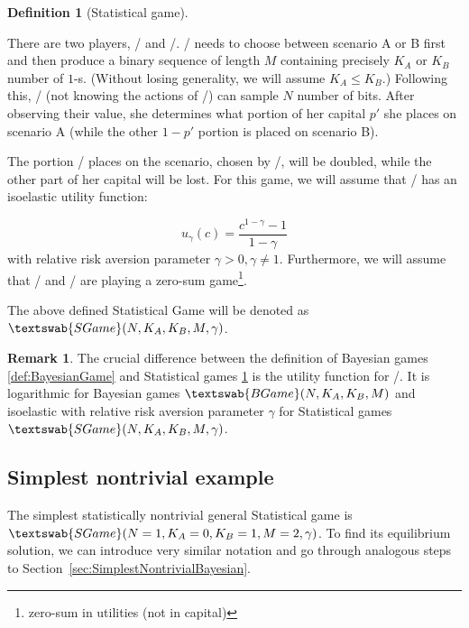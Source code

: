 \documentclass{article}
\theoremstyle{definition}
\newtheorem{definition}{Definition}[section]
\newtheorem*{remark}{Remark}
\newcommand{\BG}[1]{$\textswab{BGame}(#1)$}
\newcommand{\SG}[1]{$\textswab{SGame}(#1)$}
\begin{document}
\begin{definition}[Statistical game]
\label{def:StatisticalGame}

There are two players, \PI/ and \PII/.
\PII/ needs to choose between scenario A or B first and then produce a binary sequence of length $M$ containing precisely $K_A$ or $K_B$ number of $1$-s. (Without losing generality, we will assume $K_A \le K_B$.)
Following this, \PI/ (not knowing the actions of \PII/) can sample $N$ number of bits. After observing their value, she determines what portion of her capital $p'$ she places on scenario A (while the other $1-p'$ portion is placed on scenario B).

The portion \PI/ places on the scenario, chosen by \PII/, will be doubled, while the other part of her capital will be lost.
For this game, we will assume that \PI/ has an isoelastic utility function:

\begin{equation}
    u_\gamma(c) = \frac{c^{1-\gamma}-1}{1-\gamma}
\end{equation}
with relative risk aversion parameter $\gamma > 0, \gamma \ne 1$.
Furthermore, we will assume that \PI/ and \PII/ are playing a zero-sum game\footnote{zero-sum in utilities (not in capital)}.

The above defined Statistical Game will be denoted as 
\SG{N, K_A, K_B, M, \gamma}.

\end{definition}

\begin{remark}
    The crucial difference between the definition of Bayesian games \ref{def:BayesianGame} and Statistical games \ref{def:StatisticalGame} is the utility function for \PI/.
    It is logarithmic for Bayesian games \BG{N,K_A,K_B,M} and isoelastic with relative risk aversion parameter $\gamma$ for Statistical games \SG{N,K_A,K_B,M,\gamma}.
    
\end{remark}



\subsection{Simplest nontrivial example}

The simplest statistically nontrivial general Statistical game is \SG{N=1,K_A=0,K_B=1,M=2,\gamma}.
To find its equilibrium solution, we can introduce very similar notation and go through analogous steps to Section~\ref{sec:SimplestNontrivialBayesian}.
\end{document}

